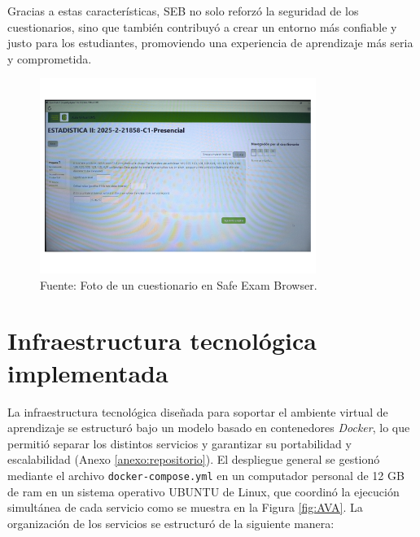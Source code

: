 \documentclass[letter,oneside,12pt,spanish]{report}
\begin{document}
Gracias a estas características, SEB no solo reforzó la seguridad de los cuestionarios, sino que también contribuyó a crear un entorno más confiable y justo para los estudiantes, promoviendo una experiencia de aprendizaje más seria y comprometida.

\begin{figure}[ht]
	\centering
	\includegraphics[width=0.8\textwidth]{Figs/SEB.pdf}
	\label{fig:SEB}
	\\Fuente: Foto de un cuestionario en Safe Exam Browser.
\end{figure}

\section{Infraestructura tecnológica implementada}

La infraestructura tecnológica diseñada para soportar el ambiente virtual de aprendizaje se estructuró bajo un modelo basado en contenedores \textit{Docker}, lo que permitió separar los distintos servicios y garantizar su portabilidad y escalabilidad (Anexo \ref{anexo:repositorio}). El despliegue general se gestionó mediante el archivo \texttt{docker-compose.yml} en un computador personal de 12 GB de ram en un sistema operativo UBUNTU de Linux, que coordinó la ejecución simultánea de cada servicio como se muestra en la Figura \ref{fig:AVA}. La organización de los servicios se estructuró de la siguiente manera:
\end{document}
